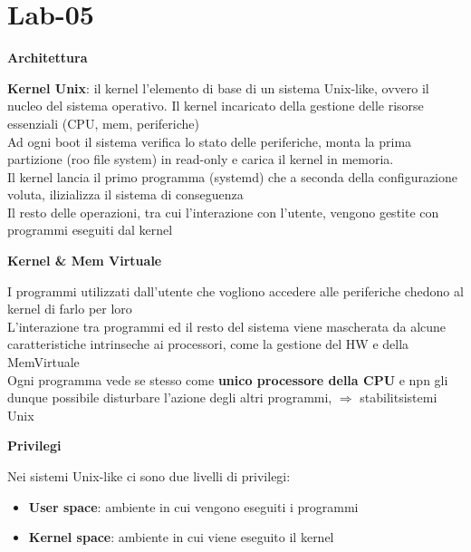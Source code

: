 \section{Lab-05}
\begin{flushleft}
  \textbf{Architettura}\\
  \begin{flushleft}
    \textbf{Kernel Unix}: il kernel \ace l'elemento di base di un sistema Unix-like, ovvero il nucleo 
    del sistema operativo. Il kernel \ace incaricato della gestione delle risorse essenziali (CPU, mem, periferiche) \\
    Ad ogni boot il sistema verifica lo stato delle periferiche, monta la prima partizione (roo file system) in read-only e 
    carica il kernel in memoria. \\ Il kernel lancia il primo programma (systemd) che a seconda 
    della configurazione voluta, ilizializza il sistema di conseguenza \\
    Il resto delle operazioni, tra cui l'interazione con l'utente, vengono gestite con programmi eseguiti dal kernel \par 
    \textbf{Kernel \& Mem Virtuale} \par 
    I programmi utilizzati dall'utente che vogliono accedere alle periferiche chedono al kernel di farlo per loro \\
    L'interazione tra programmi ed il resto del sistema viene mascherata da alcune caratteristiche intrinseche ai processori, come 
    la gestione del HW e della MemVirtuale \\
    Ogni programma vede se stesso come \textbf{unico processore della CPU} e npn gli \ace 
    dunque possibile disturbare l'azione degli altri programmi, $\Rightarrow$ stabilit\aca sistemi Unix \par 
    \textbf{Privilegi} \par 
    Nei sistemi Unix-like ci sono due livelli di privilegi:
    \begin{itemize}
      \item \textbf{User space}: ambiente in cui vengono eseguiti i programmi
      \item \textbf{Kernel space}: ambiente in cui viene eseguito il kernel
    \end{itemize}
  \end{flushleft}

\end{flushleft}
